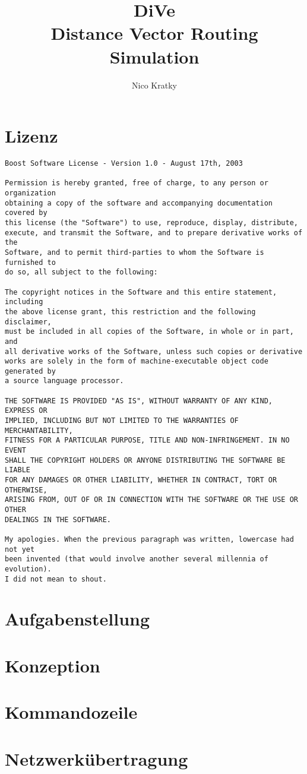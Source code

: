 \documentclass[a4paper,ngerman]{article}
\title{%
    DiVe \\
    Distance Vector Routing Simulation
}
\author{Nico Kratky}
\begin{document}
\begin{titlepage}
\maketitle
\end{titlepage}

\tableofcontents
\clearpage

\section{Lizenz}
\begin{verbatim}
Boost Software License - Version 1.0 - August 17th, 2003

Permission is hereby granted, free of charge, to any person or organization
obtaining a copy of the software and accompanying documentation covered by
this license (the "Software") to use, reproduce, display, distribute,
execute, and transmit the Software, and to prepare derivative works of the
Software, and to permit third-parties to whom the Software is furnished to
do so, all subject to the following:

The copyright notices in the Software and this entire statement, including
the above license grant, this restriction and the following disclaimer,
must be included in all copies of the Software, in whole or in part, and
all derivative works of the Software, unless such copies or derivative
works are solely in the form of machine-executable object code generated by
a source language processor.

THE SOFTWARE IS PROVIDED "AS IS", WITHOUT WARRANTY OF ANY KIND, EXPRESS OR
IMPLIED, INCLUDING BUT NOT LIMITED TO THE WARRANTIES OF MERCHANTABILITY,
FITNESS FOR A PARTICULAR PURPOSE, TITLE AND NON-INFRINGEMENT. IN NO EVENT
SHALL THE COPYRIGHT HOLDERS OR ANYONE DISTRIBUTING THE SOFTWARE BE LIABLE
FOR ANY DAMAGES OR OTHER LIABILITY, WHETHER IN CONTRACT, TORT OR OTHERWISE,
ARISING FROM, OUT OF OR IN CONNECTION WITH THE SOFTWARE OR THE USE OR OTHER
DEALINGS IN THE SOFTWARE.

My apologies. When the previous paragraph was written, lowercase had not yet
been invented (that would involve another several millennia of evolution).
I did not mean to shout.
\end{verbatim}

\section{Aufgabenstellung}

\section{Konzeption}

\section{Kommandozeile}

\section{Netzwerkübertragung}
\end{document}

